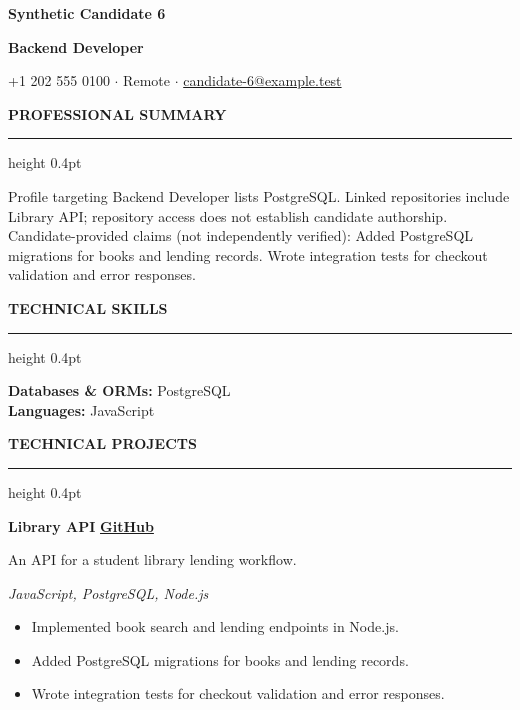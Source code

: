 \documentclass[10pt,letterpaper]{article}
\newcommand{\atsHeaderToSection}{10pt}
\newcommand{\atsSectionToSection}{9pt}
\newcommand{\atsHeadingToContent}{3pt}
\newcommand{\atsProjectTitleToTech}{1.5pt}
\newcommand{\atsProjectTechToBullets}{2.5pt}
\newcommand{\atsBulletToBullet}{1.2pt}
\newcommand{\atssection}[1]{%
  \vspace{\atsSectionToSection}%
  {\noindent\large\bfseries\uppercase{#1}}\par
  \vspace{1.5pt}\hrule height 0.4pt\vspace{\atsHeadingToContent}%
}
\newcommand{\atsfirstsection}[1]{%
  \vspace{\atsHeaderToSection}%
  {\noindent\large\bfseries\uppercase{#1}}\par
  \vspace{1.5pt}\hrule height 0.4pt\vspace{\atsHeadingToContent}%
}
\begin{document}
{\centering
  {\Huge \textbf{Synthetic Candidate 6}}\par
  \vspace{3pt}
  {\large \textbf{Backend Developer}}\par
  \vspace{3pt}
  {\small +1 202 555 0100 $\cdot$ Remote $\cdot$ \href{mailto:candidate-6@example.test}{candidate-6@example.test}}\par
}

\atsfirstsection{Professional Summary}
Profile targeting Backend Developer lists PostgreSQL. Linked repositories include Library API; repository access does not establish candidate authorship. Candidate-provided claims (not independently verified): Added PostgreSQL migrations for books and lending records. Wrote integration tests for checkout validation and error responses.\par

\atssection{Technical Skills}
\textbf{Databases \& ORMs:} PostgreSQL\\
\textbf{Languages:} JavaScript\par

\atssection{Technical Projects}
\textbf{Library API} \hfill {\small \href{https://github.com/synthetic-fixture/project-1}{\textbf{GitHub}}}\par
An API for a student library lending workflow.\par
\vspace{\atsProjectTitleToTech}
{\textit{JavaScript, PostgreSQL, Node.js}}\par
\vspace{\atsProjectTechToBullets}
\begin{itemize}
\setlength{\itemsep}{\atsBulletToBullet}\setlength{\parskip}{0pt}\setlength{\parsep}{0pt}\setlength{\topsep}{0pt}\setlength{\partopsep}{0pt}
  \item Implemented book search and lending endpoints in Node.js.
  \item Added PostgreSQL migrations for books and lending records.
  \item Wrote integration tests for checkout validation and error responses.
\end{itemize}
\end{document}
